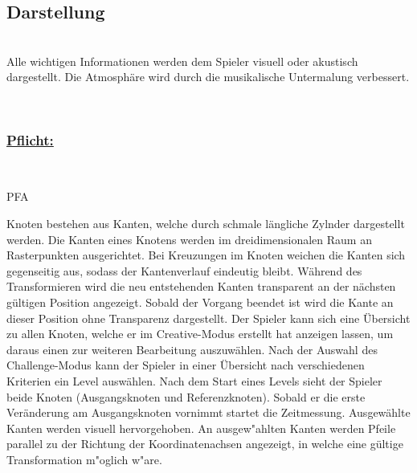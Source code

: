 %
%


\subsection{Darstellung}

%
%
\renewcommand{\K}{}
%
%

~\\
Alle wichtigen Informationen werden dem Spieler visuell oder akustisch dargestellt. Die Atmosphäre wird durch die musikalische Untermalung verbessert.

~\\

%
%
\subsubsection*{\underline{Pflicht:}}~\\

\begin{ids}{\gls{PFA\K}}

	\id[ 280] Knoten bestehen aus Kanten, welche durch schmale längliche Zylnder dargestellt werden.
	\id[ 290] Die Kanten eines Knotens werden im dreidimensionalen Raum an Rasterpunkten ausgerichtet.
	\id[ 300] Bei Kreuzungen im Knoten weichen die Kanten sich gegenseitig aus, sodass der Kantenverlauf eindeutig bleibt.
	\id[ 310] Während des Transformieren wird die neu entstehenden Kanten transparent an der nächsten gültigen Position angezeigt. Sobald der Vorgang beendet ist wird die Kante an dieser Position ohne Transparenz dargestellt.
	\id[ 320] Der Spieler kann sich eine Übersicht zu allen Knoten, welche er im Creative-Modus erstellt hat anzeigen lassen, um daraus einen zur weiteren Bearbeitung auszuwählen.
	\id[ 330] Nach der Auswahl des Challenge-Modus kann der Spieler in einer Übersicht nach verschiedenen Kriterien ein Level auswählen.
	\id[ 340] Nach dem Start eines Levels sieht der Spieler beide Knoten (Ausgangsknoten und Referenzknoten). Sobald er die erste Veränderung am Ausgangsknoten vornimmt startet die Zeitmessung.
	\id[ 350] Ausgewählte Kanten werden visuell hervorgehoben.
	\id[ 355] An ausgew{"a}hlten Kanten werden Pfeile parallel zu der Richtung der Koordinatenachsen angezeigt, in welche eine gültige Transformation m{"o}glich w{"a}re.
	
	
 	
 	
	
\end{ids}


